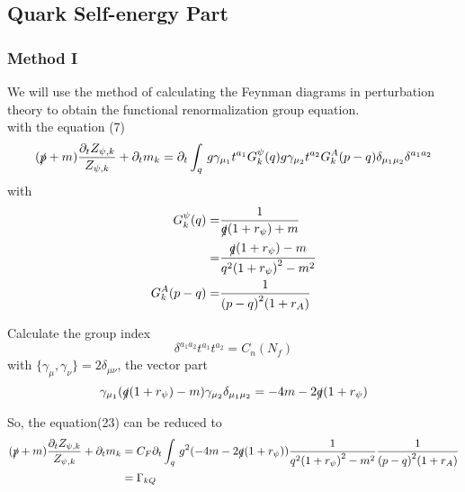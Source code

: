 \documentclass[UTF8]{ctexart}
\begin{document}
\subsection{Quark Self-energy Part}
\subsubsection{Method I}
We will use the method of calculating the Feynman diagrams in perturbation theory to obtain the functional renormalization  group equation.
\\with the equation (7)
\begin{equation}
(\slashed{p}+m)\frac{\partial_{t}Z_{\psi,k}}{Z_{\psi,k}}+\partial_{t}m_{k}=\partial_{t}\int_{q}\,g\gamma_{\mu_1}t^{a_1}G_{k}^{\psi}(q)g\gamma_{\mu_2}t^{a_2}G_{k}^{A}(p-q)\delta_{\mu_1 \mu_2}\delta^{a_1 a_2}
\end{equation}
with
\begin{align}
G_{k}^{\psi}(q)=&\frac{1}{\slashed{q}(1+r_{\psi})+m}\notag\\=&\frac{\slashed{q}(1+r_{\psi})-m}{q^2{(1+r_{\psi})}^2-m^2}
\\G_{k}^{A}(p-q)=&\frac{1}{{(p-q)}^2 (1+r_A)}
\end{align}
\par Calculate the group index
\begin{equation}
\delta^{a_1 a_2}t^{a_1}t^{a_2}=C_{n}(N_f)
\end{equation}
with $\{\gamma_{\mu},\gamma_{\nu}\}=2\delta_{\mu\nu}$, the vector part
\begin{equation}
\gamma_{\mu_1}({\slashed{q}(1+r_{\psi})-m})\gamma_{\mu_2}\delta_{\mu_1 \mu_2}=-4m-2\slashed{q}(1+r_{\psi})
\end{equation}
\par So, the equation(23) can be reduced to
\begin{align}
(\slashed{p}+m)\frac{\partial_{t}Z_{\psi,k}}{Z_{\psi,k}}+\partial_{t}m_{k}
&=C_F\partial_{t}\int_{q}\,g^2 (-4m-2\slashed{q}(1+r_{\psi}))\frac{1}{q^2{(1+r_{\psi})}^2-m^2}\frac{1}{{(p-q)}^2 (1+r_A)}
\notag\\&=\Gamma_{kQ}
\end{align}
\end{document}
